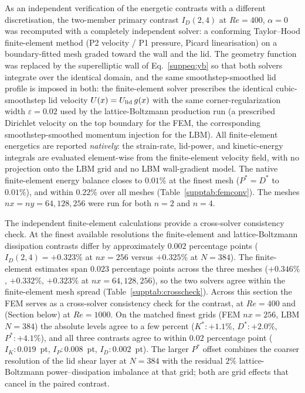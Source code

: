 As an independent verification of the energetic contrasts with a different discretisation, the two-member primary contrast $I_D(2,4)$ at $Re=400$, $\alpha=0$ was recomputed with a completely independent solver: a conforming Taylor--Hood finite-element method (P2 velocity / P1 pressure, Picard linearisation) on a boundary-fitted mesh graded toward the wall and the lid. The geometry function was replaced by the superelliptic wall of Eq.~\eqref{suppeq:yb} so that both solvers integrate over the identical domain, and the same smoothstep-smoothed lid profile is imposed in both: the finite-element solver prescribes the identical cubic-smoothstep lid velocity $U(x)=U_{\rm lid}\,g(x)$ with the same corner-regularization width $\varepsilon=0.02$ used by the lattice-Boltzmann production run (a prescribed Dirichlet velocity on the top boundary for the FEM, the corresponding smoothstep-smoothed momentum injection for the LBM). All finite-element energetics are reported \emph{natively}: the strain-rate, lid-power, and kinetic-energy integrals are evaluated element-wise from the finite-element velocity field, with no projection onto the LBM grid and no LBM wall-gradient model. The native finite-element energy balance closes to $0.01\%$ at the finest mesh ($P^*=D^*$ to $0.01\%$), and within $0.22\%$ over all meshes (Table~\ref{supptab:femconv}). The meshes $nx=ny=64,128,256$ were run for both $n=2$ and $n=4$.

The independent finite-element calculations provide a cross-solver consistency check. At the finest available resolutions the finite-element and lattice-Boltzmann dissipation contrasts differ by approximately $0.002$ percentage points ($I_D(2,4)=+0.323\%$ at $nx=256$ versus $+0.325\%$ at $N=384$). The finite-element estimates span $0.023$ percentage points across the three meshes ($+0.346\%$, $+0.332\%$, $+0.323\%$ at $nx=64,128,256$), so the two solvers agree within the finite-element mesh spread (Table~\ref{supptab:crosscheck}). Across this section the FEM serves as a cross-solver consistency check for the contrast, at $Re=400$ and (Section below) at $Re=1000$. On the matched finest grids (FEM $nx=256$, LBM $N=384$) the absolute levels agree to a few percent ($K^*: +1.1\%$, $D^*: +2.0\%$, $P^*: +4.1\%$), and all three contrasts agree to within $0.02$ percentage point ($I_K: 0.019$~pt, $I_P: 0.008$~pt, $I_D: 0.002$~pt). The larger $P^*$ offset combines the coarser resolution of the lid shear layer at $N=384$ with the residual $2\%$ lattice-Boltzmann power--dissipation imbalance at that grid; both are grid effects that cancel in the paired contrast.

